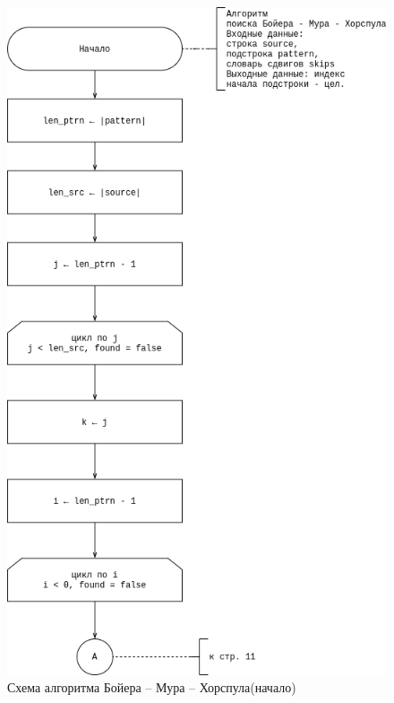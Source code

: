 \begin{center}
	\begin{figure}[H]
		\centering
		\includegraphics[width=0.8\linewidth]{assets/bmh_pipe-bmh-search-start.drawio.png}
		\caption{Схема алгоритма  Бойера -- Мура -- Хорспула(начало)}
		\label{fig:bmh-start}
	\end{figure}
\end{center}

